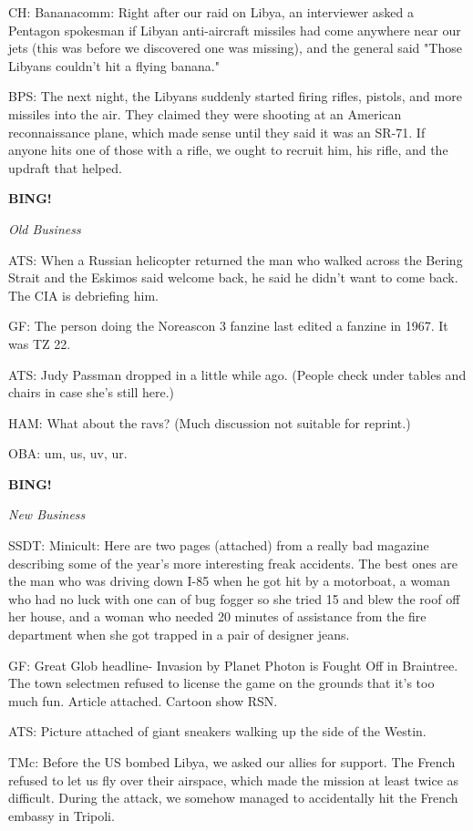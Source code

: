 \documentclass[12pt]{article}
\newcommand{\bing}{{\bf BING!} }
\newcommand{\goto}[1]{\bing \vskip 12pt \centerline{{\em{#1}}}}
\begin{document}
CH: Bananacomm: Right after our raid on Libya, an interviewer asked a Pentagon spokesman if Libyan anti-aircraft missiles had come anywhere near our jets (this was before we discovered one was missing), and the general said "Those Libyans couldn't hit a flying banana."

BPS: The next night, the Libyans suddenly started firing rifles, pistols, and more missiles into the air. They claimed they were shooting at an American reconnaissance plane, which made sense until they said it was an SR-71. If anyone hits one of those with a rifle, we ought to recruit him, his rifle, and the updraft that helped.

\goto{Old Business}

ATS: When a Russian helicopter returned the man who walked across the Bering Strait and the Eskimos said welcome back, he said he didn't want to come back. The CIA is debriefing him.

GF: The person doing the Noreascon 3 fanzine last edited a fanzine in 1967. It was TZ 22.

ATS: Judy Passman dropped in a little while ago. (People check under tables and chairs in case she's still here.)

HAM: What about the ravs? (Much discussion not suitable for reprint.)

OBA: um, us, uv, ur.

\goto{New Business}

SSDT: Minicult: Here are two pages (attached) from a really bad magazine describing some of the year's more interesting freak accidents. The best ones are the man who was driving down I-85 when he got hit by a motorboat, a woman who had no luck with one can of bug fogger so she tried 15 and blew the roof off her house, and a woman who needed 20 minutes of assistance from the fire department when she got trapped in a pair of designer jeans.

GF: Great Glob headline- Invasion by Planet Photon is Fought Off in Braintree. The town selectmen refused to license the game on the grounds that it's too much fun. Article attached. Cartoon show RSN.

ATS: Picture attached of giant sneakers walking up the side of the Westin.

TMc: Before the US bombed Libya, we asked our allies for support. The French refused to let us fly over their airspace, which made the mission at least twice as difficult. During the attack, we somehow managed to accidentally hit the French embassy in Tripoli.
\end{document}
